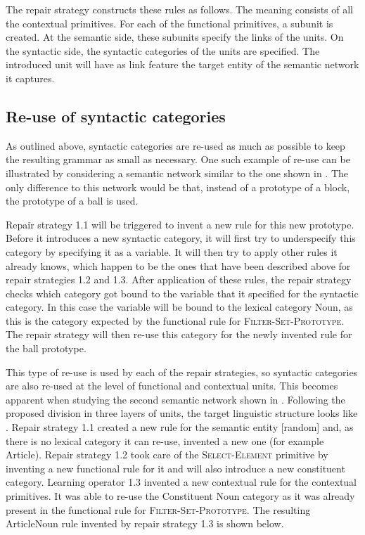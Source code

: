 The repair strategy constructs these rules as follows. The meaning
consists of all the contextual primitives. For each of the functional
primitives, a subunit is created. At the semantic side, these subunits
specify the links of the units. On the syntactic side, the syntactic
categories of the units are specified. The introduced unit will
have as link feature the target entity of the semantic network it
captures.

\subsection{Re-use of syntactic categories}

As outlined above, syntactic categories are re-used as much as
possible to keep the resulting grammar as small as 
necessary. One such example of re-use can be illustrated by considering
a semantic network similar to the one shown in . The only difference to this network would be
that, instead of a prototype of a block, the prototype of a ball is
used.

Repair strategy 1.1 will be triggered to invent a new rule for
this new prototype. Before it introduces a new syntactic category, it
will first try to underspecify this category by specifying it as a
variable. It will then try to apply other rules it already knows,
which happen to be the ones that have been described above for
repair strategies 1.2 and 1.3. After application of these rules, the
repair strategy checks which category got bound to the variable that
it specified for the syntactic category. In this case the variable
will be bound to the lexical category Noun, as this is the category
expected by the functional rule for \textsc{Filter-Set-Prototype}. The
repair strategy will then re-use this category for the newly
invented rule for the ball prototype.

This type of re-use is used by each of the repair strategies, so
syntactic categories are also re-used at the level of functional and
contextual units. This becomes apparent when studying the second
semantic network shown in . Following the
proposed division in three layers of units, the target linguistic
structure looks like . Repair strategy 1.1
created a new rule for the semantic entity [random] and, as there is
no lexical category it can re-use, invented a new one (for example
Article). Repair strategy 1.2 took care of the
\textsc{Select-Element} primitive by inventing a new functional rule
for it and will also introduce a new constituent category. Learning
operator 1.3 invented a new contextual rule for the contextual
primitives. It was able to re-use the Constituent Noun category as it
was already present in the functional rule for
\textsc{Filter-Set-Prototype}. The resulting ArticleNoun rule invented
by repair strategy 1.3 is shown below.

